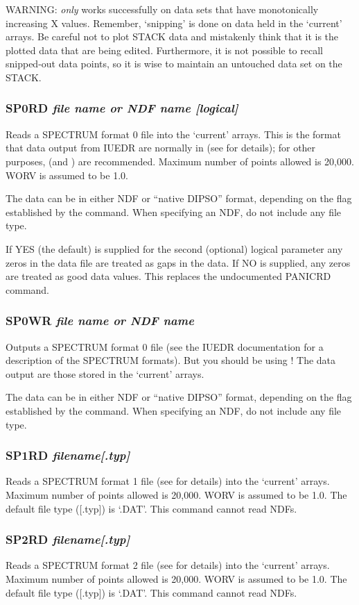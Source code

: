 \documentclass[twoside,11pt,noabs,nolof]{starlink}
\providecommand{\dipcom}[3]{\subsubsection*{\label{COM:#1}\textbf{#1} \emph{#2}}}
\begin{document}
WARNING:   \emph{only} works successfully on data sets that have
monotonically increasing X values. Remember, `snipping' is done on
data held in the `current' arrays. Be careful not to plot STACK data
and mistakenly think that it is the plotted data that are being
edited. Furthermore, it is not possible to recall snipped-out data
points, so it is wise to maintain an untouched data set on the STACK.

\dipcom{SP0RD}{file name or NDF name [logical]}{Reads an IUE SPECTRUM format 0 file into the current arrays}
Reads a SPECTRUM format 0 file into the `current' arrays. This is the
format that data output from IUEDR are normally in (see
 for
details); for other purposes,   (and )  are recommended.
Maximum number of points allowed is 20,000. WORV is assumed to be 1.0.

The data can be in either NDF or ``native DIPSO'' format, depending
on the flag established by the   command. When specifying an NDF, do
not include any file type.

If YES (the default) is supplied for the second (optional) logical
parameter any zeros in the data file are treated as gaps in the data. If
NO is supplied, any zeros are treated as good data values. This replaces
the undocumented PANICRD command.


\dipcom{SP0WR}{file name or NDF name}{Writes the current arrays to an IUE SPECTRUM format 0 file}
Outputs a SPECTRUM format 0 file (see the IUEDR documentation
for a description of the SPECTRUM formats). But you should be using
!  The data output are those stored in the `current' arrays.

The data can be in either NDF or ``native DIPSO'' format, depending on the flag
established by the   command. When specifying an NDF, do not include
any file type.

\dipcom{SP1RD}{filename[.typ]}{Reads an IUE SPECTRUM format 1 file into the current arrays}
Reads a SPECTRUM format 1 file (see  for details) into the
`current' arrays. Maximum number of points allowed is 20,000. WORV is
assumed to be 1.0. The default file type ([.typ]) is `.DAT'. This command
cannot read NDFs.

\dipcom{SP2RD}{filename[.typ]}{Reads an IUE SPECTRUM format 2 file into the current arrays}
Reads a SPECTRUM format 2 file (see  for details) into the
`current' arrays. Maximum number of points allowed is 20,000. WORV is
assumed to be 1.0. The default file type ([.typ]) is `.DAT'. This command
cannot read NDFs.
\end{document}
